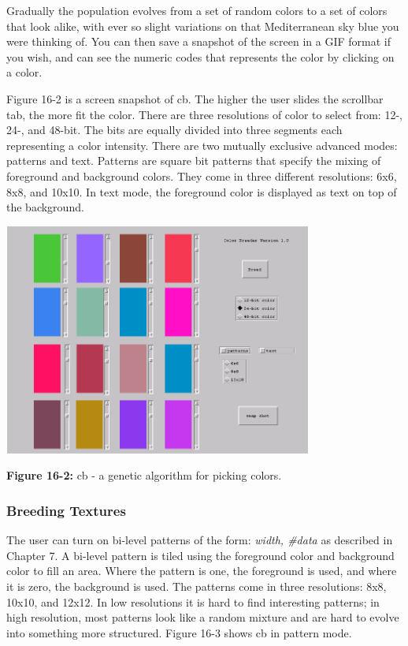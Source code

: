 Gradually the population evolves from a set of random colors to a set of
colors that look alike, with ever so slight variations on that
Mediterranean sky blue you were thinking of. You can then save a
snapshot of the screen in a GIF format if you wish, and can see the
numeric codes that represents the color by clicking on a color.

Figure 16-2 is a screen snapshot of \textsf{cb}. The higher the user
slides the scrollbar tab, the more fit the color. There are three
resolutions of color to select from: 12-, 24-, and 48-bit.
The bits are equally divided into three segments each representing a
color intensity. There are two mutually exclusive advanced modes:
patterns and text. Patterns are square bit patterns that specify the
mixing of foreground and background colors. They come in three
different resolutions: 6x6, 8x8, and 10x10. In text mode, the
foreground color is displayed as text on top of the background.

\begin{center}
\includegraphics[width=4.0in,height=3.0in]{ub-img/ub-img46.png}
\end{center}

{\sffamily\bfseries Figure 16-2:}
{\sffamily cb - a genetic algorithm for picking colors.}

\subsubsection{Breeding Textures}

The user can turn on bi-level patterns of the form: \textit{width,
\#data} as described in Chapter 7. A bi-level pattern is tiled using
the foreground color and background color to fill an area. Where the
pattern is one, the foreground is used, and where it is zero, the
background is used. The patterns come in three resolutions: 8x8, 10x10,
and 12x12. In low resolutions it is hard to find interesting patterns;
in high resolution, most patterns look like a random mixture and are
hard to evolve into something more structured. Figure 16-3 shows
\textsf{cb} in pattern mode.

